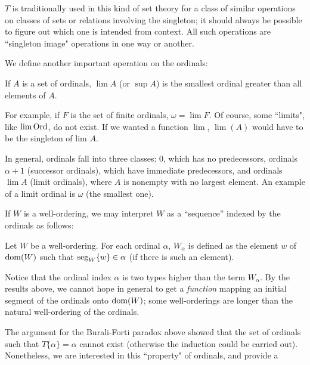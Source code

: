 $T$ is traditionally used in this kind of set theory for a class of
similar operations on classes of sets or relations involving
the singleton; it should always be
possible to figure out which one is intended from context.  All such operations
are ``singleton image" 
operations in one way or another.

We define another important operation on the ordinals:

\begin{definition}
 If $A$ is a set of ordinals, $\lim A$ (or $\sup A$) is the
 smallest ordinal greater than all elements of $A$.
\end{definition}

For example, if $F$ is the set of finite ordinals,
$\omega = \lim F$.  Of course, some ``limits", like $\lim \mathrm{Ord}$, do not exist.
If we wanted a function $\lim$, $\lim(A)$ would have to be the
singleton of lim $A$.

In general, ordinals fall into three classes: 0, which
has no predecessors, ordinals $\alpha +1$ (successor
ordinals), which have immediate predecessors, and ordinals $\lim A$ (limit
ordinals), where $A$ is nonempty 
with no largest element.  An example of a limit ordinal is $\omega$
(the smallest one).

If $W$ is a well-ordering, we may interpret $W$ as a
``sequence'' 
indexed by the ordinals as follows:

\begin{definition}
 Let $W$ be a well-ordering. For each ordinal
 $\alpha$, $W_{\alpha}$ is defined as the element $w$ of $\mathop{\mathrm{dom}}(W)$ such
 that $\seg_W\{w\}\index{segment} \in \alpha$ (if there is such an element). 
\end{definition}

Notice that the ordinal index $\alpha$ is two types
higher than the term $W_{\alpha}$.  By the results above, we cannot hope in
general to get a {\itshape function\/} mapping an initial
segment of the ordinals onto $\mathop{\mathrm{dom}}(W)$; some
well-orderings are longer than the natural
well-ordering of the ordinals.

The argument for the Burali-Forti paradox above
showed that the set of ordinals such that $T\{\alpha\} = \alpha$ cannot exist (otherwise the induction could be carried
out).  Nonetheless, we are interested in this ``property" of
ordinals, and provide a

